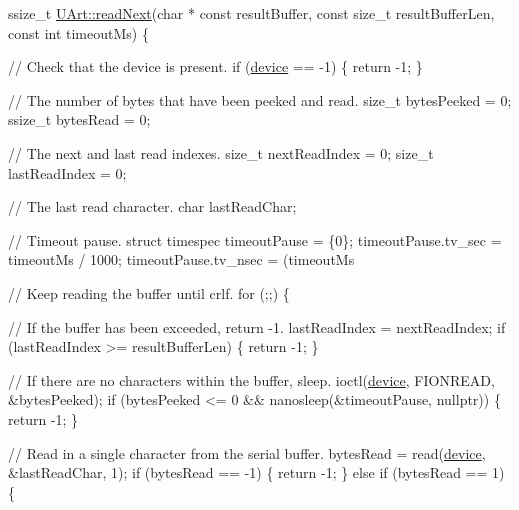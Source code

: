 \begin{DoxyCode}
ssize\_t \hyperlink{class_u_art_aa4818ca67447e251680b4b8d28c8bba5}{UArt::readNext}(\textcolor{keywordtype}{char} * \textcolor{keyword}{const} resultBuffer, \textcolor{keyword}{const} \textcolor{keywordtype}{size\_t} resultBufferLen,
                       \textcolor{keyword}{const} \textcolor{keywordtype}{int} timeoutMs)
\{

    \textcolor{comment}{// Check that the device is present.}
    \textcolor{keywordflow}{if} (\hyperlink{class_u_art_a61fb55cc7c92c85f2219dffcfb58bc12}{device} == -1) \{
        \textcolor{keywordflow}{return} -1;
    \}

    \textcolor{comment}{// The number of bytes that have been peeked and read.}
    \textcolor{keywordtype}{size\_t} bytesPeeked = 0;
    ssize\_t bytesRead = 0;

    \textcolor{comment}{// The next and last read indexes.}
    \textcolor{keywordtype}{size\_t} nextReadIndex = 0;
    \textcolor{keywordtype}{size\_t} lastReadIndex = 0;

    \textcolor{comment}{// The last read character.}
    \textcolor{keywordtype}{char} lastReadChar;

    \textcolor{comment}{// Timeout pause.}
    \textcolor{keyword}{struct }timespec timeoutPause = \{0\};
    timeoutPause.tv\_sec = timeoutMs / 1000;
    timeoutPause.tv\_nsec = (timeoutMs %

    \textcolor{comment}{// Keep reading the buffer until crlf.}
    \textcolor{keywordflow}{for} (;;) \{

        \textcolor{comment}{// If the buffer has been exceeded, return -1.}
        lastReadIndex = nextReadIndex;
        \textcolor{keywordflow}{if} (lastReadIndex >= resultBufferLen) \{
            \textcolor{keywordflow}{return} -1;
        \}

        \textcolor{comment}{// If there are no characters within the buffer, sleep.}
        ioctl(\hyperlink{class_u_art_a61fb55cc7c92c85f2219dffcfb58bc12}{device}, FIONREAD, &bytesPeeked);
        \textcolor{keywordflow}{if} (bytesPeeked <= 0 && nanosleep(&timeoutPause, \textcolor{keyword}{nullptr})) \{
            \textcolor{keywordflow}{return} -1;
        \}

        \textcolor{comment}{// Read in a single character from the serial buffer.}
        bytesRead = read(\hyperlink{class_u_art_a61fb55cc7c92c85f2219dffcfb58bc12}{device}, &lastReadChar, 1);
        \textcolor{keywordflow}{if} (bytesRead == -1) \{
            \textcolor{keywordflow}{return} -1;
        \} \textcolor{keywordflow}{else} \textcolor{keywordflow}{if} (bytesRead == 1) \{


\end{DoxyCode}
